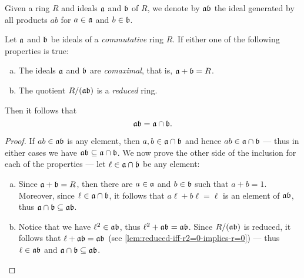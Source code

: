 \begin{definition}
    \label{def:product-ideal}
    Given a ring \(R\) and ideals \(\mathfrak{a}\) and \(\mathfrak{b}\) of \(R\), we
    denote by \(\mathfrak{a b}\) the ideal generated by all products \(a b\) for \(a
    \in \mathfrak{a}\) and \(b \in \mathfrak{b}\).
\end{definition}

\begin{lemma}
    \label{lem:}
    Let \(\mathfrak{a}\) and \(\mathfrak{b}\) be ideals of a \emph{commutative} ring
    \(R\). If either one of the following properties is true:
    \begin{enumerate}[(a)]\setlength\itemsep{0em}
        \item The ideals \(\mathfrak{a}\) and \(\mathfrak{b}\) are \emph{comaximal}, that is,
              \(\mathfrak{a} + \mathfrak{b} = R\).

        \item The quotient \(R/(\mathfrak{a b})\) is a \emph{reduced} ring.
    \end{enumerate}
    Then it follows that
    \[
        \mathfrak{a b} = \mathfrak{a} \cap \mathfrak{b}.
    \]
\end{lemma}

\begin{proof}
    If \(a b \in \mathfrak{a b}\) is any element, then
    \(a, b \in \mathfrak{a} \cap \mathfrak{b}\) and hence
    \(a b \in \mathfrak{a} \cap \mathfrak{b}\) --- thus in either cases we have
    \(\mathfrak{a b} \subseteq \mathfrak{a} \cap \mathfrak{b}\). We now prove the other side
    of the inclusion for each of the properties --- let
    \(\ell \in \mathfrak{a} \cap \mathfrak{b}\) be any element:
    \begin{enumerate}[(a)]\setlength\itemsep{0em}
        \item Since \(\mathfrak{a} + \mathfrak{b} = R\), then there are \(a \in \mathfrak{a}\)
              and \(b \in \mathfrak{b}\) such that \(a + b = 1\). Moreover, since
              \(\ell \in \mathfrak{a} \cap \mathfrak{b}\), it follows that
              \(a \ell + b \ell = \ell\) is an element of \(\mathfrak{a b}\), thus
              \(\mathfrak{a} \cap \mathfrak{b} \subseteq \mathfrak{a b}\).

        \item Notice that we have \(\ell^2 \in \mathfrak{a b}\), thus
              \(\ell^2 + \mathfrak{a b} = \mathfrak{a b}\). Since \(R/(\mathfrak{a b})\) is reduced,
              it follows that \(\ell + \mathfrak{a b} = \mathfrak{a b}\) (see
              \cref{lem:reduced-iff-r2=0-implies-r=0}) --- thus \(\ell \in \mathfrak{a b}\) and
              \(\mathfrak{a} \cap \mathfrak{b} \subseteq \mathfrak{a b}\).
    \end{enumerate}
\end{proof}

